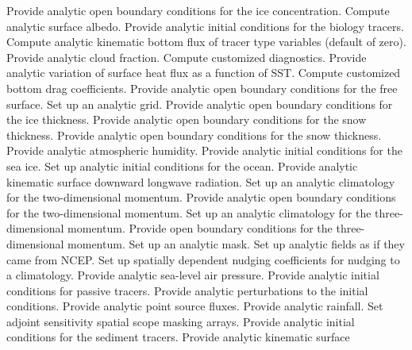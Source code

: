    \begin{klist}
      Provide analytic open boundary conditions for the ice
   concentration.
      Compute analytic surface albedo.
      Provide analytic initial conditions for the
   biology tracers.
       Compute analytic kinematic bottom flux of
   tracer type variables (default of zero).
      Provide analytic cloud fraction.
      Compute customized diagnostics.
      Provide analytic variation of surface heat
   flux as a function of SST.
      Compute customized bottom drag coefficients.
      Provide analytic open boundary conditions for
   the free surface.
       Set up an analytic grid.
      Provide analytic open boundary conditions for the ice
   thickness.
      Provide analytic open boundary conditions for the snow
   thickness.
      Provide analytic open boundary conditions for the snow
   thickness.
      Provide analytic atmospheric humidity.
      Provide analytic initial conditions for the sea ice.
       Set up analytic initial conditions for the ocean.
       Provide analytic kinematic surface
   downward longwave radiation.
      Set up an analytic climatology for the
   two-dimensional momentum.
      Provide analytic open boundary conditions for the
   two-dimensional momentum.
      Set up an analytic climatology for the
   three-dimensional momentum.
      Provide open boundary conditions for the
   three-dimensional momentum.
       Set up an analytic mask.
       Set up analytic fields as if they came from NCEP.
       Set up spatially dependent nudging
   coefficients for nudging to a climatology.
       Provide analytic sea-level air pressure.
       Provide analytic initial conditions for
   passive tracers.
       Provide analytic perturbations to the
   initial conditions.
       Provide analytic point source fluxes.
       Provide analytic rainfall.
       Set adjoint sensitivity spatial scope masking
   arrays.
       Provide analytic initial conditions for the
   sediment tracers.
       Provide analytic kinematic surface

\end{klist}
